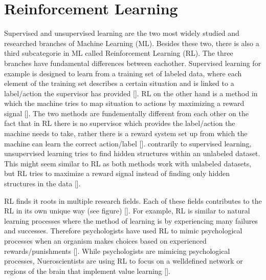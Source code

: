 \documentclass[letterpaper,10pt,english]{jupyterBook}
\begin{document}
\chapter{Reinforcement Learning}
\label{\detokenize{Reinforcement_learning:reinforcement-learning}}\label{\detokenize{Reinforcement_learning::doc}}
\sphinxAtStartPar
Supervised and unsupervised learning are the two most widely studied and researched branches of Machine Learning (ML). Besides these two, there is also a third subcategorie in ML called Reinforcement Learning (RL). The three branches have fundamental differences between eachother. Supervised learning for example is designed to learn from a training set of labeled data, where each element of the training set describes a certain situation and is linked to a label/action the supervisor has provided {[}{]}. RL on the other hand is a method in which the machine tries to map situation to actions by maximizing a reward signal {[}{]}. The two methods are fundementally different from each other on the fact that in RL there is no supervisor which provides the label/action the machine needs to take, rather there is a reward system set up from which the machine can learn the correct action/label {[}{]}. contrarily to supervised learning, unsupervised learning tries to find hidden structures within an unlabeled dataset. This might seem similar to RL as both methods work with unlabeled datasets, but RL tries to maximize a reward signal instead of finding only hidden structures in the data {[}{]}.

\sphinxAtStartPar
RL finds it roots in multiple research fields. Each of these fields contributes to the RL in its own unique way (see figure) {[}{]}. For example,  RL is similar to natural learning processes where the method of learning is by experiencing many failures and successes. Therefore psychologists have used RL to mimic psychological processes when an organism makes choices based on experienced rewards/punishments {[}{]}. While psychologists are mimicing psychological processes, Nueroscientists are using RL to focus on a well\sphinxhyphen{}defined network or regions of the brain that implement value learning {[}{]}.

\sphinxAtStartPar
{}
\end{document}
